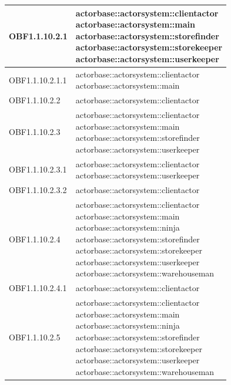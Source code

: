 \documentclass{scalatekids-article}
\begin{document}
\begin{longtable}[H]{|p{3.5cm}|p{7.5cm}|}
  \hline
  OBF1.1.10.2.1 & \multiLineCell[t]{actorbase::actorsystem::clientactor\\actorbase::actorsystem::main\\actorbase::actorsystem::storefinder\\actorbase::actorsystem::storekeeper\\actorbase::actorsystem::userkeeper\\}\\
  \hline
  OBF1.1.10.2.1.1 & \multiLineCell[t]{actorbase::actorsystem::clientactor\\actorbase::actorsystem::main\\}\\
  \hline
  OBF1.1.10.2.2 & \multiLineCell[t]{actorbase::actorsystem::clientactor\\}\\
  \hline
  OBF1.1.10.2.3 & \multiLineCell[t]{actorbase::actorsystem::clientactor\\actorbase::actorsystem::main\\actorbase::actorsystem::storefinder\\actorbase::actorsystem::userkeeper\\}\\
  \hline
  OBF1.1.10.2.3.1 & \multiLineCell[t]{actorbase::actorsystem::clientactor\\actorbase::actorsystem::userkeeper\\}\\
  \hline
  OBF1.1.10.2.3.2 & \multiLineCell[t]{actorbase::actorsystem::clientactor\\}\\
  \hline
  OBF1.1.10.2.4 & \multiLineCell[t]{actorbase::actorsystem::clientactor\\actorbase::actorsystem::main\\actorbase::actorsystem::ninja\\actorbase::actorsystem::storefinder\\actorbase::actorsystem::storekeeper\\actorbase::actorsystem::userkeeper\\actorbase::actorsystem::warehouseman\\}\\
  \hline
  OBF1.1.10.2.4.1 & \multiLineCell[t]{actorbase::actorsystem::clientactor\\}\\
  \hline
  OBF1.1.10.2.5 & \multiLineCell[t]{actorbase::actorsystem::clientactor\\actorbase::actorsystem::main\\actorbase::actorsystem::ninja\\actorbase::actorsystem::storefinder\\actorbase::actorsystem::storekeeper\\actorbase::actorsystem::userkeeper\\actorbase::actorsystem::warehouseman\\}\\

\end{longtable}
\end{document}
